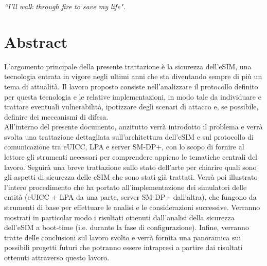 \documentclass[10pt, oneside]{book}
\begin{document}
\begin{frontespizio}
\end{frontespizio}

\begin{flushright}
\null{}
\textit{``I'll walk through fire to save my life".}
\null
\end{flushright}

\chapter*{Abstract}
L'argomento principale della presente trattazione è la sicurezza dell'eSIM, una tecnologia entrata in vigore negli ultimi anni che sta diventando sempre di più un tema di attualità. Il lavoro proposto consiste nell'analizzare il protocollo definito per questa tecnologia e le relative implementazioni, in modo tale da individuare e trattare eventuali vulnerabilità, ipotizzare degli scenari di attacco e, se possibile, definire dei meccanismi di difesa.\\
All'interno del presente documento, anzitutto verrà introdotto il problema e verrà svolta una trattazione dettagliata sull'architettura dell'eSIM e sul protocollo di comunicazione tra eUICC, LPA e server SM-DP+, con lo scopo di fornire al lettore gli strumenti necessari per comprendere appieno le tematiche centrali del lavoro. Seguirà una breve trattazione sullo stato dell'arte per chiarire quali sono gli aspetti di sicurezza delle eSIM che sono stati già trattati. Verrà poi illustrato l'intero procedimento che ha portato all'implementazione dei simulatori delle entità (eUICC + LPA da una parte, server SM-DP+ dall'altra), che fungono da strumenti di base per effettuare le analisi e le considerazioni successive. Verranno mostrati in particolar modo i risultati ottenuti dall'analisi della sicurezza dell'eSIM a boot-time (i.e. durante la fase di configurazione). Infine, verranno tratte delle conclusioni sul lavoro svolto e verrà fornita una panoramica sui possibili progetti futuri che potranno essere intrapresi a partire dai risultati ottenuti attraverso questo lavoro.
\end{document}
